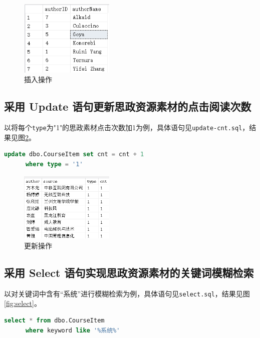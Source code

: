 \documentclass[11pt]{article}
\begin{document}
  \begin{figure}[h]
    \centering
    \includegraphics[width=0.4\textwidth]{insert.png}
    \caption{插入操作}
    \label{fig:insert}
  \end{figure}

  \subsection{采用 Update 语句更新思政资源素材的点击阅读次数}
  以将每个\verb|type|为"1"的思政素材点击次数加1为例，具体语句见\verb|update-cnt.sql|，结果见图\ref{fig:update}。

  \begin{file}
    \begin{lstlisting}[language=sql]
      update dbo.CourseItem set cnt = cnt + 1
      where type = '1'
    \end{lstlisting}
  \end{file}

  \begin{figure}[h]
    \centering
    \includegraphics[width=0.4\textwidth]{update.png}
    \caption{更新操作}
    \label{fig:update}
  \end{figure}

  \subsection{采用 Select 语句实现思政资源素材的关键词模糊检索}
  以对关键词中含有“系统”进行模糊检索为例，具体语句见\verb|select.sql|，结果见图\ref{fig:select}。

  \begin{file}
    \begin{lstlisting}[language=sql]
      select * from dbo.CourseItem 
      where keyword like '%系统%'
    \end{lstlisting}
  \end{file}
\end{document}
